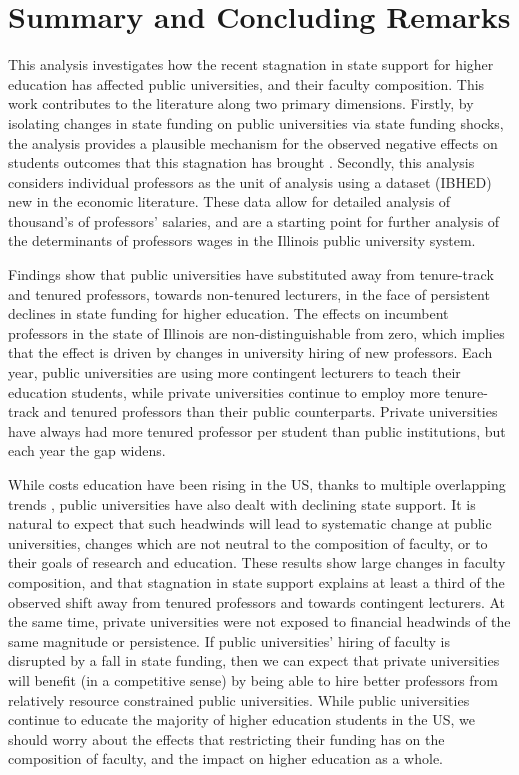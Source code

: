 \section{Summary and Concluding Remarks}
\label{sec:conclusion}

This analysis investigates how the recent stagnation in state support for higher education has affected public universities, and their faculty composition.
This work contributes to the literature along two primary dimensions.
Firstly, by isolating changes in state funding on public universities via state funding shocks, the analysis provides a plausible mechanism for the observed negative effects on students outcomes that this stagnation has brought \citep{NBERw23736,NBERw27885}.
Secondly, this analysis considers individual professors as the unit of analysis using a dataset (IBHED) new in the economic literature.
These data allow for detailed analysis of thousand's of professors' salaries, and are a starting point for further analysis of the determinants of professors wages in the Illinois public university system.

Findings show that public universities have substituted away from tenure-track and tenured professors, towards non-tenured lecturers, in the face of persistent declines in state funding for higher education.
The effects on incumbent professors in the state of Illinois are non-distinguishable from zero, which implies that the effect is driven by changes in university hiring of new professors.
Each year, public universities are using more contingent lecturers to teach their education students, while private universities continue to employ more tenure-track and tenured professors than their public counterparts.
Private universities have always had more tenured professor per student than public institutions, but each year the gap widens.

While costs education have been rising in the US, thanks to multiple overlapping trends \citep{ehrenberg2012}, public universities have also dealt with declining state support.
It is natural to expect that such headwinds will lead to systematic change at public universities, changes which are not neutral to the composition of faculty, or to their goals of research and education.
These results show large changes in faculty composition, and that stagnation in state support explains at least a third of the observed shift away from tenured professors and towards contingent lecturers.
At the same time, private universities were not exposed to financial headwinds of the same magnitude or persistence.
If public universities' hiring of faculty is disrupted by a fall in state funding, then we can expect that private universities will benefit (in a competitive sense) by being able to hire better professors from relatively resource constrained public universities.
While public universities continue to educate the majority of higher education students in the US, we should worry about the effects that restricting their funding has on the composition of faculty, and the impact on higher education as a whole.
